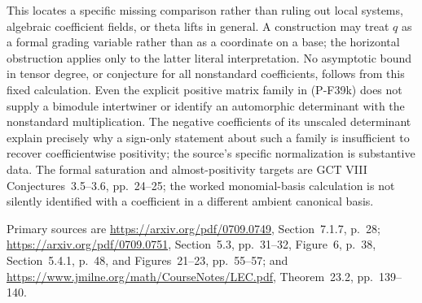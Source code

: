 This locates a specific missing comparison rather than ruling
out local systems, algebraic coefficient fields, or theta lifts
in general. A construction may treat $q$ as a formal grading
variable rather than as a coordinate on a base; the horizontal
obstruction applies only to the latter literal interpretation.
No asymptotic bound in tensor degree, or conjecture for all
nonstandard coefficients, follows from this fixed calculation.
Even the explicit positive matrix family in (P-F39k) does not
supply a bimodule intertwiner or identify an automorphic
determinant with the nonstandard multiplication. The negative
coefficients of its unscaled determinant explain precisely why
a sign-only statement about such a family is insufficient to
recover coefficientwise positivity; the source's specific
normalization is substantive data.
The formal saturation and almost-positivity targets are
GCT VIII Conjectures~3.5--3.6, pp.~24--25; the worked
monomial-basis calculation is not silently identified with a
coefficient in a different ambient canonical basis.

Primary sources are
\url{https://arxiv.org/pdf/0709.0749}, Section~7.1.7, p.~28;
\url{https://arxiv.org/pdf/0709.0751}, Section~5.3, pp.~31--32,
Figure~6, p.~38, Section~5.4.1, p.~48, and Figures~21--23,
pp.~55--57; and
\url{https://www.jmilne.org/math/CourseNotes/LEC.pdf},
Theorem~23.2, pp.~139--140.

